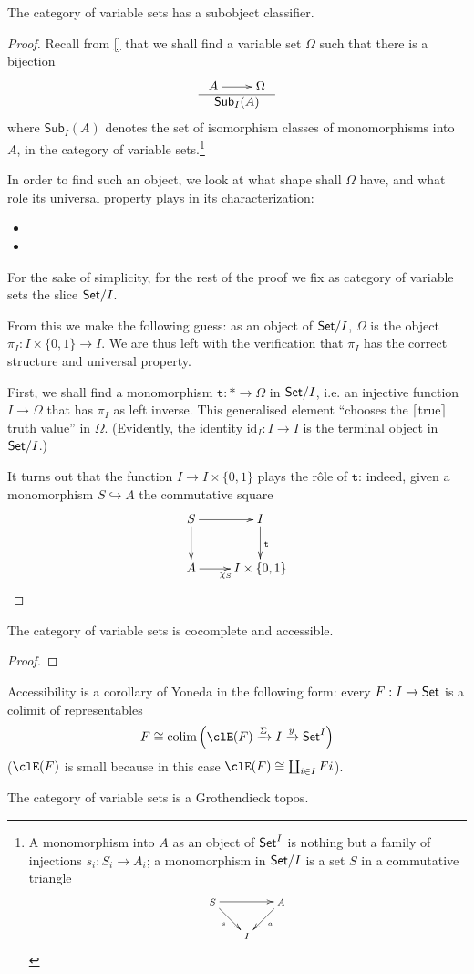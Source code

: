 \documentclass{amsart}
\newcommand{\true}{\texttt{t}}
\def\id{\text{id}}
\begin{document}
\begin{proposition}
The category of variable sets has a subobject classifier.
\end{proposition}
\begin{proof}
  Recall from \ref{} that we shall find a variable set $\Omega$ such that there is a bijection
  \[\begin{array}{c}
    \xymatrix{A \ar[r] & \Omega} \\ \hline
    \textsf{Sub}_I(A)
  \end{array}\]
  where $\textsf{Sub}_I(A)$ denotes the set of isomorphism classes of monomorphisms into $A$, in the category of variable sets.\footnote{A monomorphism into $A$ as an object of $\mathsf{Set}^I$ is nothing but a family of injections $s_i : S_i \to A_i$; a monomorphism in $\mathsf{Set}/I$ is a set $S$ in a commutative triangle
  \[\scriptsize
  \xymatrix@!=1mm{S\ar[rr]\ar[dr]_s && A\ar[dl]^a \\ &I&}\]}

  In order to find such an object, we look at what shape shall $\Omega$ have, and what role its universal property plays in its characterization:
  \begin{itemize}
    \item
    \item
  \end{itemize}
  For the sake of simplicity, for the rest of the proof we fix as category of variable sets the slice $\mathsf{Set}/I$.

  From this we make the following guess: as an object of $\mathsf{Set}/I$, $\Omega$ is the object $\pi_I : I\times \{0,1\} \to I$. We are thus left with the verification that $\pi_I$ has the correct structure and universal property.

  First, we shall find a monomorphism $\true : * \to \Omega$ in $\mathsf{Set}/I$, i.e. an injective function $I\to \Omega$ that has $\pi_I$ as left inverse. This generalised element ``chooses the $\lceil$true$\rceil$ truth value'' in $\Omega$. (Evidently, the identity $\id_I : I \to I$ is the terminal object in $\mathsf{Set}/I$.)

  It turns out that the function $I \to I\times \{0,1\}$ plays the r\^ole of $\true$: indeed, given a monomorphism $S \hookrightarrow A$ the commutative square
  \[
  \vcenter{\xymatrix{
    S\ar[d]\ar[r] & I \ar[d]^{\true}\\
    A \ar[r]_{\chi_S} & I\times \{0,1\}
  }}
  \]
\end{proof}
\begin{proposition}
The category of variable sets is cocomplete and accessible.
\end{proposition}
\begin{proof}

\end{proof}
Accessibility is a corollary of Yoneda in the following form: every $F : I \to \mathsf{Set}$ is a colimit of representables
\[
F \cong \colim\Big(\clE(F) \xto{\Sigma} I \xto{y} \Set^I\Big)
\]
($\clE(F)$ is small because in this case $\clE(F)\cong\coprod_{i\in I}Fi$).
\begin{corollary}
  The category of variable sets is a Grothendieck topos.
\end{corollary}
\end{document}
